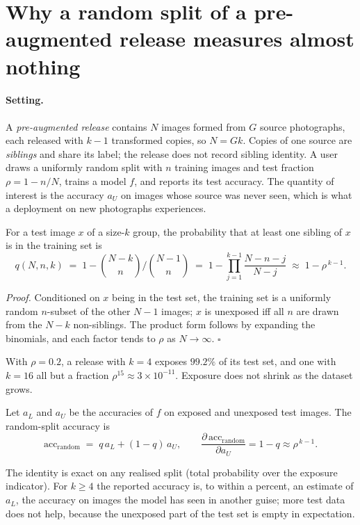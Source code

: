 \section{Why a random split of a pre-augmented release measures almost nothing}
\label{sec:theory}

\paragraph{Setting.}
A \emph{pre-augmented release} contains $N$ images formed from $G$ source photographs, each released with $k-1$ transformed copies, so $N=Gk$. Copies of one source are \emph{siblings} and share its label; the release does not record sibling identity. A user draws a uniformly random split with $n$ training images and test fraction $\rho=1-n/N$, trains a model $f$, and reports its test accuracy. The quantity of interest is the accuracy $a_U$ on images whose source was never seen, which is what a deployment on new photographs experiences.

\begin{proposition}[Exposure]\label{prop:exposure}
For a test image $x$ of a size-$k$ group, the probability that at least one sibling of $x$ is in the training set is
\begin{equation}
q(N,n,k) \;=\; 1-\binom{N-k}{n}\Big/\binom{N-1}{n} \;=\; 1-\prod_{j=1}^{k-1}\frac{N-n-j}{N-j}\;\approx\; 1-\rho^{\,k-1}.
\label{eq:exposure}
\end{equation}
\end{proposition}
\emph{Proof.} Conditioned on $x$ being in the test set, the training set is a uniformly random $n$-subset of the other $N-1$ images; $x$ is unexposed iff all $n$ are drawn from the $N-k$ non-siblings. The product form follows by expanding the binomials, and each factor tends to $\rho$ as $N\to\infty$. \hfill$\square$

With $\rho=0.2$, a release with $k=4$ exposes $99.2\%$ of its test set, and one with $k=16$ all but a fraction $\rho^{15}\approx3\times10^{-11}$. Exposure does not shrink as the dataset grows.

\begin{proposition}\label{prop:decomp}
Let $a_L$ and $a_U$ be the accuracies of $f$ on exposed and unexposed test images. The random-split accuracy is
\begin{equation}
\mathrm{acc}_{\text{random}} \;=\; q\,a_L + (1-q)\,a_U,
\qquad
\frac{\partial\,\mathrm{acc}_{\text{random}}}{\partial a_U}=1-q\approx\rho^{\,k-1}.
\label{eq:decomp}
\end{equation}
\end{proposition}
The identity is exact on any realised split (total probability over the exposure indicator). For $k\geq4$ the reported accuracy is, to within a percent, an estimate of $a_L$, the accuracy on images the model has seen in another guise; more test data does not help, because the unexposed part of the test set is empty in expectation.

